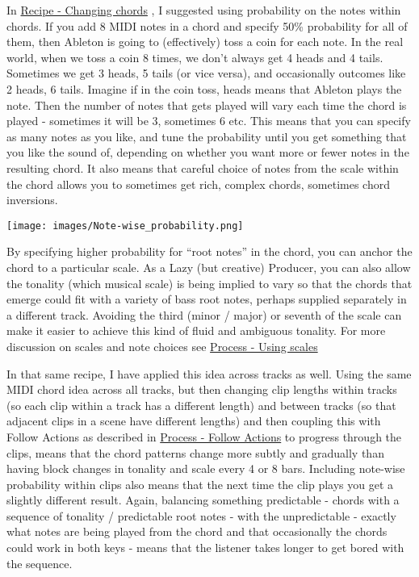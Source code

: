 \documentclass[
  12pt,
  letterpaper,
  oneside,
  open=any]{scrbook}
\begin{document}
In \hyperref[Chapter-001-Recipe-Changing_Chords]{Recipe - Changing
chords} , I suggested using probability on the notes within chords. If
you add 8 MIDI notes in a chord and specify 50\% probability for all of
them, then Ableton is going to (effectively) toss a coin for each note.
In the real world, when we toss a coin 8 times, we don't always get 4
heads and 4 tails. Sometimes we get 3 heads, 5 tails (or vice versa),
and occasionally outcomes like 2 heads, 6 tails. Imagine if in the coin
toss, heads means that Ableton plays the note. Then the number of notes
that gets played will vary each time the chord is played - sometimes it
will be 3, sometimes 6 etc. This means that you can specify as many
notes as you like, and tune the probability until you get something that
you like the sound of, depending on whether you want more or fewer notes
in the resulting chord. It also means that careful choice of notes from
the scale within the chord allows you to sometimes get rich, complex
chords, sometimes chord inversions.

\texttt{[image: images/Note-wise\_probability.png]}

By specifying higher probability for ``root notes'' in the chord, you
can anchor the chord to a particular scale. As a Lazy (but creative)
Producer, you can also allow the tonality (which musical scale) is being
implied to vary so that the chords that emerge could fit with a variety
of bass root notes, perhaps supplied separately in a different track.
Avoiding the third (minor / major) or seventh of the scale can make it
easier to achieve this kind of fluid and ambiguous tonality. For more
discussion on scales and note choices see
\hyperref[Chapter-018-Process-Scales]{Process - Using scales}

In that same recipe, I have applied this idea across tracks as well.
Using the same MIDI chord idea across all tracks, but then changing clip
lengths within tracks (so each clip within a track has a different
length) and between tracks (so that adjacent clips in a scene have
different lengths) and then coupling this with Follow Actions as
described in \hyperref[Chapter-003-Process-Follow_Actions]{Process -
Follow Actions} to progress through the clips, means that the chord
patterns change more subtly and gradually than having block changes in
tonality and scale every 4 or 8 bars. Including note-wise probability
within clips also means that the next time the clip plays you get a
slightly different result. Again, balancing something predictable -
chords with a sequence of tonality / predictable root notes - with the
unpredictable - exactly what notes are being played from the chord and
that occasionally the chords could work in both keys - means that the
listener takes longer to get bored with the sequence.
\end{document}
